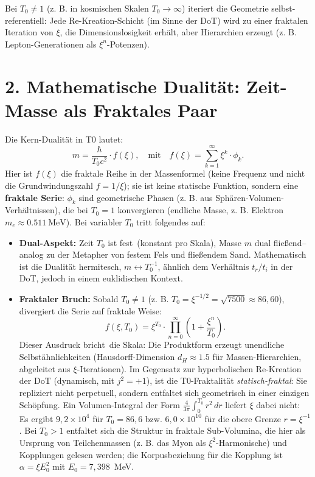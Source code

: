 	\begin{important}
		Bei \( T_0 \neq 1 \) (z. B. in kosmischen Skalen \( T_0 \to \infty \)) iteriert die Geometrie selbst-referentiell: Jede \glqq Re-Kreation\grqq-Schicht (im Sinne der DoT) wird zu einer fraktalen Iteration von \( \xi \), die Dimensionslosigkeit erhält, aber Hierarchien erzeugt (z. B. Lepton-Generationen als \( \xi^n \)-Potenzen).
	\end{important}
	
	\section*{2. Mathematische Dualität: Zeit-Masse als Fraktales Paar}
	Die Kern-Dualität in T0 lautet:
	\[
	m = \frac{\hbar}{T_0 c^2} \cdot f(\xi), \quad \text{mit} \quad f(\xi) = \sum_{k=1}^\infty \xi^k \cdot \phi_k.
	\]
	Hier ist \( f(\xi) \) die fraktale Reihe in der Massenformel (keine Frequenz und nicht die Grundwindungszahl \( f = 1/\xi \)); sie ist keine statische Funktion, sondern eine \textbf{fraktale Serie}: \( \phi_k \) sind geometrische Phasen (z. B. aus Sphären-Volumen-Verhältnissen), die bei \( T_0 = 1 \) konvergieren (endliche Masse, z. B. Elektron \( m_e \approx \SI{0.511}{\mega\electronvolt}\)). Bei variabler \( T_0 \) tritt folgendes auf:
	\begin{itemize}
		\item \textbf{Dual-Aspekt:} Zeit \( T_0 \) ist \glqq fest\grqq\ (konstant pro Skala), Masse \( m \) dual \glqq fließend\grqq – analog zu der Metapher von festem Fels und fließendem Sand. Mathematisch ist die Dualität hermitesch, \( m \leftrightarrow T_0^{-1} \), ähnlich dem Verhältnis \( t_r / t_i \) in der DoT, jedoch in einem euklidischen Kontext.
		\item \textbf{Fraktaler Bruch:} Sobald \( T_0 \neq 1 \) (z. B. \( T_0 = \xi^{-1/2} = \sqrt{7500} \approx 86{,}60 \)), divergiert die Serie auf fraktale Weise:
		\[
		f(\xi, T_0) = \xi^{T_0} \cdot \prod_{n=0}^\infty \left(1 + \frac{\xi^n}{T_0}\right).
		\]
		Dieser Ausdruck \glqq bricht\grqq\ die Skala: Die Produktform erzeugt unendliche Selbstähnlichkeiten (Hausdorff-Dimension \( d_H \approx 1.5 \) für Massen-Hierarchien, abgeleitet aus \( \xi \)-Iterationen). Im Gegensatz zur hyperbolischen Re-Kreation der DoT (dynamisch, mit \( j^2 = +1 \)), ist die T0-Fraktalität \emph{statisch-fraktal}: Sie repliziert nicht perpetuell, sondern entfaltet sich geometrisch in einer einzigen \glqq Schöpfung\grqq. Ein Volumen-Integral der Form \( \frac{4}{3\pi}\int_0^{T_0} r^2\,dr \) liefert \( \xi \) dabei nicht: Es ergibt \( 9{,}2\times10^4 \) für \( T_0 = 86{,}6 \) bzw. \( 6{,}0\times10^{10} \) für die obere Grenze \( r = \xi^{-1} \).
		Bei \( T_0 > 1 \) entfaltet sich die Struktur in fraktale Sub-Volumina, die hier als Ursprung von Teilchenmassen (z. B. das Myon als \( \xi^2 \)-Harmonische) und Kopplungen gelesen werden; die Korpusbeziehung für die Kopplung ist \( \alpha = \xi E_0^2 \) mit \( E_0 = 7{,}398 \)~MeV.
	\end{itemize}

